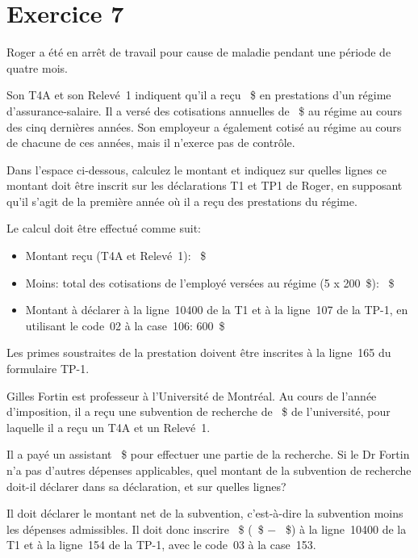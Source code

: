 \section{Exercice 7}
\setcounter{question}{0}
\begin{question}
	Roger a été en arrêt de travail pour cause de maladie pendant une période de quatre mois.
	
	Son T4A et son Relevé~1 indiquent qu'il a reçu ~\$ en prestations d'un régime d'assurance-salaire. Il a versé des cotisations annuelles de ~\$ au régime au cours des cinq dernières années. Son employeur a également cotisé au régime au cours de chacune de ces années, mais il n'exerce pas de contrôle. 
	
	Dans l'espace ci-dessous, calculez le montant et indiquez sur quelles lignes ce montant doit être inscrit sur les déclarations T1 et TP1 de Roger, en supposant qu'il s'agit de la première année où il a reçu des prestations du régime.
\end{question}
Le calcul doit être effectué comme suit:

\begin{itemize}
	\item Montant reçu (T4A et Relevé~1): ~\$
	\item Moins: total des cotisations de l'employé versées au régime (5 x 200~\$): ~\$ 
	\item Montant à déclarer à la ligne~10400 de la T1 et à la ligne~107 de la TP-1, en utilisant le code~02 à la case~106: 600~\$
\end{itemize}

Les primes soustraites de la prestation doivent être inscrites à la ligne~165 du formulaire TP-1.

\begin{question}
	Gilles Fortin est professeur à l'Université de Montréal. Au cours de l'année d'imposition, il a reçu une subvention de recherche de ~\$ de l'université, pour laquelle il a reçu un T4A et un
	Relevé~1.
	
	Il a payé un assistant ~\$ pour effectuer une partie de la recherche.
	Si le Dr Fortin n'a pas d'autres dépenses applicables, quel montant de la subvention de recherche doit-il déclarer dans sa déclaration, et sur quelles lignes?
\end{question}
Il doit déclarer le montant net de la subvention, c'est-à-dire la subvention moins les dépenses admissibles. Il doit donc inscrire ~\$ (~\$ $-$ ~\$) à la ligne~10400 de la T1 et à la ligne~154 de la TP-1, avec le code~03 à la case~153.



